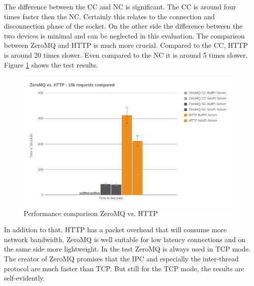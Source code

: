 The difference between the \ac{CC} and \ac{NC} is significant.
The \ac{CC} is around four times faster then the \ac{NC}.
Certainly this relates to the connection and disconnection phase of the socket.
On the other side the difference between the two devices is minimal and can be neglected in this evaluation.
The comparison between ZeroMQ and \ac{HTTP} is much more crucial.
Compared to the \ac{CC}, \ac{HTTP} is around 20 times slower.
Even compared to the \ac{NC} it is around 5 times slower.
Figure \ref{fig:performance_zeromq_vs_http} shows the test results.

\begin{figure}[H]
    \centering
    \includegraphics[width=\textwidth]{resources/images/performance_zeromq_vs_http.png}
    \caption[Performance comparison ZeroMQ vs. HTTP]{Performance comparison ZeroMQ vs. HTTP}
    \label{fig:performance_zeromq_vs_http}
\end{figure}

In addition to that, \ac{HTTP} has a packet overhead that will consume more network bandwidth.
ZeroMQ is well suitable for low latency connections and on the same side more lightweight.
In the test ZeroMQ is always used in \ac{TCP} mode.
The creator of ZeroMQ promises that the \ac{IPC} and especially the inter-thread protocol are much faster than \ac{TCP}.\autocite[cf.]{ZeroMQ:UicastTransports}
But still for the \ac{TCP} mode, the results are self-evidently.


